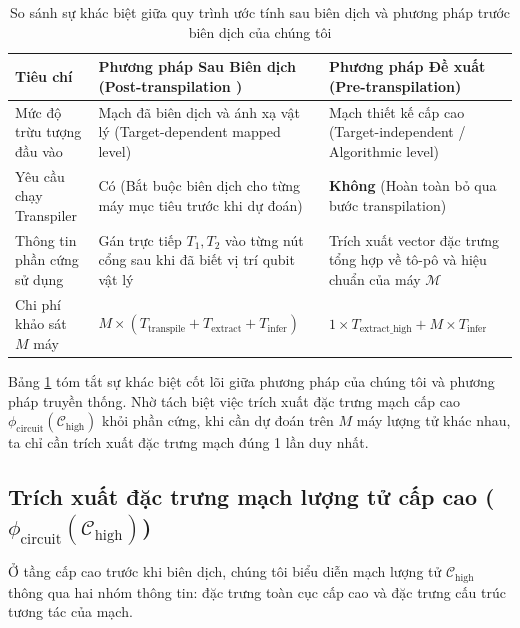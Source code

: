 \documentclass[11pt, a4paper]{article}
\begin{document}
\begin{table}[htbp]
\centering
\caption{So sánh sự khác biệt giữa quy trình ước tính sau biên dịch \cite{ma2025understanding} và phương pháp trước biên dịch của chúng tôi}
\label{tab:comparison_workflow}
\begin{tabularx}{\textwidth}{l X X}
\toprule
\textbf{Tiêu chí} & \textbf{Phương pháp Sau Biên dịch (Post-transpilation \cite{ma2025understanding})} & \textbf{Phương pháp Đề xuất (Pre-transpilation)} \\
\midrule
Mức độ trừu tượng đầu vào & Mạch đã biên dịch và ánh xạ vật lý (Target-dependent mapped level) & Mạch thiết kế cấp cao (Target-independent / Algorithmic level) \\
Yêu cầu chạy Transpiler & Có (Bắt buộc biên dịch cho từng máy mục tiêu trước khi dự đoán) & \textbf{Không} (Hoàn toàn bỏ qua bước transpilation) \\
Thông tin phần cứng sử dụng & Gán trực tiếp $T_1, T_2$ vào từng nút cổng sau khi đã biết vị trí qubit vật lý & Trích xuất vector đặc trưng tổng hợp về tô-pô và hiệu chuẩn của máy $\mathcal{M}$ \\
Chi phí khảo sát $M$ máy & $M \times (T_{\text{transpile}} + T_{\text{extract}} + T_{\text{infer}})$ & $1 \times T_{\text{extract\_high}} + M \times T_{\text{infer}}$ \\
\bottomrule
\end{tabularx}
\end{table}

Bảng \ref{tab:comparison_workflow} tóm tắt sự khác biệt cốt lõi giữa phương pháp của chúng tôi và phương pháp truyền thống. Nhờ tách biệt việc trích xuất đặc trưng mạch cấp cao $\phi_{\text{circuit}}(\mathcal{C}_{\text{high}})$ khỏi phần cứng, khi cần dự đoán trên $M$ máy lượng tử khác nhau, ta chỉ cần trích xuất đặc trưng mạch đúng 1 lần duy nhất.

\subsection{Trích xuất đặc trưng mạch lượng tử cấp cao ($\phi_{\text{circuit}}(\mathcal{C}_{\text{high}})$)}
Ở tầng cấp cao trước khi biên dịch, chúng tôi biểu diễn mạch lượng tử $\mathcal{C}_{\text{high}}$ thông qua hai nhóm thông tin: đặc trưng toàn cục cấp cao và đặc trưng cấu trúc tương tác của mạch.
\end{document}
